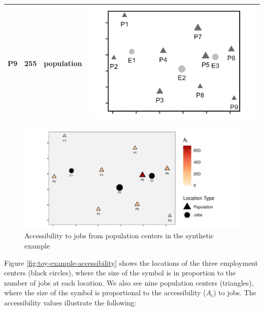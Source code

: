 \documentclass[]{elsarticle} %
\begin{document}
\begin{table}
\begin{tabular}[t]{lrl>{}l}
P9 & 255 & population & \multirow{-12}{*}{\raggedright\arraybackslash \includegraphics{images/figure-1.png}}\\
\bottomrule
\end{tabular}
\end{table}

\begin{figure}
\includegraphics[width=1\linewidth]{Spatial-Availability_files/figure-latex/toy-example-accessibility-plot-1} \caption{\label{fig:toy-example-accessibility}Accessibility to jobs from population centers in the synthetic example}\label{fig:toy-example-accessibility-plot}
\end{figure}

Figure \ref{fig:toy-example-accessibility} shows the locations of the
three employment centers (black circles), where the size of the symbol
is in proportion to the number of jobs at each location. We also see
nine population centers (triangles), where the size of the symbol is
proportional to the accessibility (\(A_i\)) to jobs. The accessibility
values illustrate the following:
\end{document}
